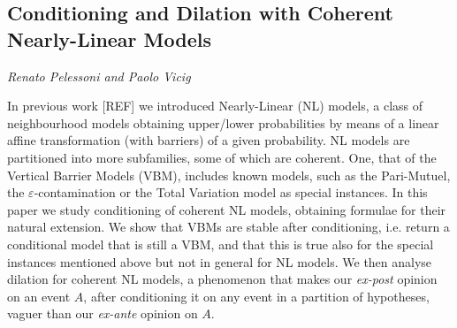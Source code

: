 \documentclass[../booklet.tex]{subfiles}
\begin{document}
\subsection[Conditioning and Dilation with Coherent Nearly-Linear Models. {\it Renato Pelessoni and Paolo Vicig}]{Conditioning and Dilation with Coherent Nearly-Linear Models}
 

\begin{center}
  {\it Renato Pelessoni and Paolo Vicig}
\end{center}



In previous work [REF] we introduced Nearly-Linear (NL) models, a class of neighbourhood models obtaining upper/lower probabilities by means of a linear affine transformation (with barriers) of a given probability.
NL models are partitioned into more subfamilies, some of which are coherent.
One, that of the Vertical Barrier Models (VBM), includes known models, such as the Pari-Mutuel, the $\varepsilon$-contamination or the Total Variation model as special instances.
In this paper we study conditioning of coherent NL models, obtaining formulae for their natural extension.
We show that VBMs are stable after conditioning, i.e. return a conditional model that is still a VBM, and that this is true also for the special instances mentioned above but not in general for NL models. We then analyse dilation for coherent NL models, a phenomenon that makes our \emph{ex-post} opinion on an event $A$, after conditioning it on any event in a partition of hypotheses, vaguer than our \emph{ex-ante} opinion on $A$.

\end{document}
